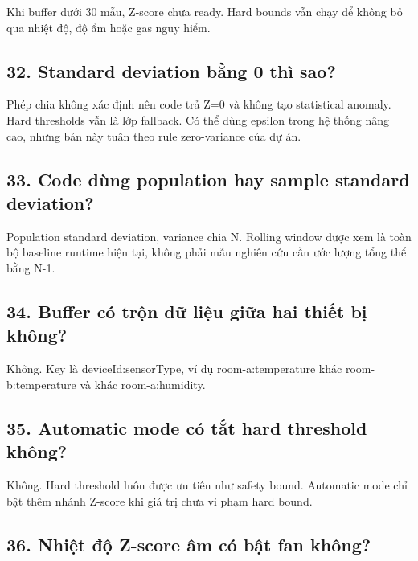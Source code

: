 \documentclass[11pt,oneside,openany]{book}
\renewcommand{\texttt}[1]{{\ttfamily\small #1}}
\begin{document}
Khi buffer dưới 30 mẫu, Z-score chưa ready. Hard bounds vẫn chạy để
không bỏ qua nhiệt độ, độ ẩm hoặc gas nguy hiểm.

\subsection{32. Standard deviation bằng 0 thì
sao?}\label{32-standard-deviation-bux1eb1ng-0-thuxec-sao}

Phép chia không xác định nên code trả Z=0 và không tạo statistical
anomaly. Hard thresholds vẫn là lớp fallback. Có thể dùng epsilon trong
hệ thống nâng cao, nhưng bản này tuân theo rule zero-variance của dự án.

\subsection{33. Code dùng population hay sample standard
deviation?}\label{33-code-duxf9ng-population-hay-sample-standard-deviation}

Population standard deviation, variance chia N. Rolling window được xem
là toàn bộ baseline runtime hiện tại, không phải mẫu nghiên cứu cần ước
lượng tổng thể bằng N-1.

\subsection{34. Buffer có trộn dữ liệu giữa hai thiết bị
không?}\label{34-buffer-cuxf3-trux1ed9n-dux1eef-liux1ec7u-giux1eefa-hai-thiux1ebft-bux1ecb-khuxf4ng}

Không. Key là \texttt{deviceId:sensorType}, ví dụ
\texttt{room-a:temperature} khác \texttt{room-b:temperature} và khác
\texttt{room-a:humidity}.

\subsection{35. Automatic mode có tắt hard threshold
không?}\label{35-automatic-mode-cuxf3-tux1eaft-hard-threshold-khuxf4ng}

Không. Hard threshold luôn được ưu tiên như safety bound. Automatic mode
chỉ bật thêm nhánh Z-score khi giá trị chưa vi phạm hard bound.

\subsection{36. Nhiệt độ Z-score âm có bật fan
không?}\label{36-nhiux1ec7t-ux111ux1ed9-z-score-uxe2m-cuxf3-bux1eadt-fan-khuxf4ng}
\end{document}

